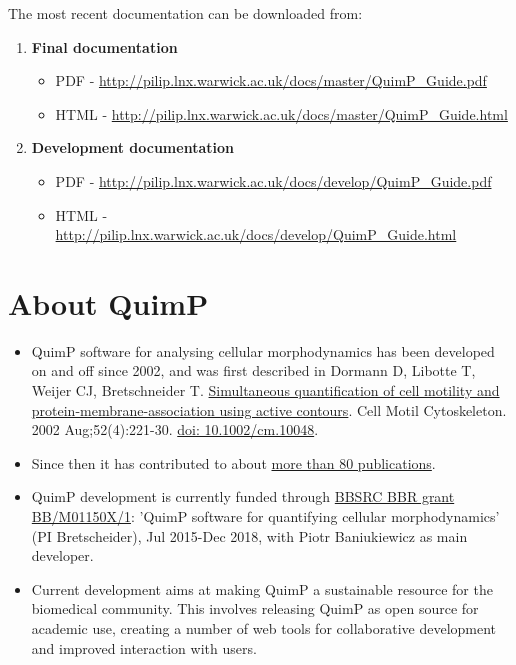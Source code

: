 \documentclass[a4paper,12pt]{article}
\begin{document}
The most recent documentation can be downloaded from:
\begin{enumerate}
	\item \textbf{Final documentation}
	\begin{itemize}
		\item PDF - \url{http://pilip.lnx.warwick.ac.uk/docs/master/QuimP_Guide.pdf}
		\item HTML - \url{http://pilip.lnx.warwick.ac.uk/docs/master/QuimP_Guide.html}
	\end{itemize}
	\item \textbf{Development documentation}
	\begin{itemize}
		\item PDF - \url{http://pilip.lnx.warwick.ac.uk/docs/develop/QuimP_Guide.pdf}
		\item HTML - \url{http://pilip.lnx.warwick.ac.uk/docs/develop/QuimP_Guide.html}
	\end{itemize}
\end{enumerate} 

\section{About QuimP}
	\begin{itemize}
	\item QuimP software for analysing cellular morphodynamics has been developed on and off since 2002, and was first described in
Dormann D, Libotte T, Weijer CJ, Bretschneider T. \href{https://www.ncbi.nlm.nih.gov/pubmed/12112136}{Simultaneous quantification of cell motility and protein-membrane-association using active contours}. Cell Motil Cytoskeleton. 2002 Aug;52(4):221-30. \href{http://dx.doi.org/10.1007/978-3-0348-8043-5_17}{doi: 10.1002/cm.10048}.
	\item Since then it has contributed to about \href{http://www.warwick.ac.uk/quimp/quimp-refs}{more than 80 publications}.
	\item QuimP development is currently funded through \href{http://www.bbsrc.ac.uk/research/grants-search/AwardDetails/?FundingReference=BB/M01150X/1}{BBSRC BBR grant BB/M01150X/1}: 'QuimP software for quantifying cellular morphodynamics' (PI Bretscheider), Jul 2015-Dec 2018, with Piotr Baniukiewicz as main developer.
	\item Current development aims at making QuimP a sustainable resource for the biomedical community. This involves releasing QuimP as open source for academic use, creating a number of web tools for collaborative development and improved interaction with users.
	\end{itemize}
\end{document}
